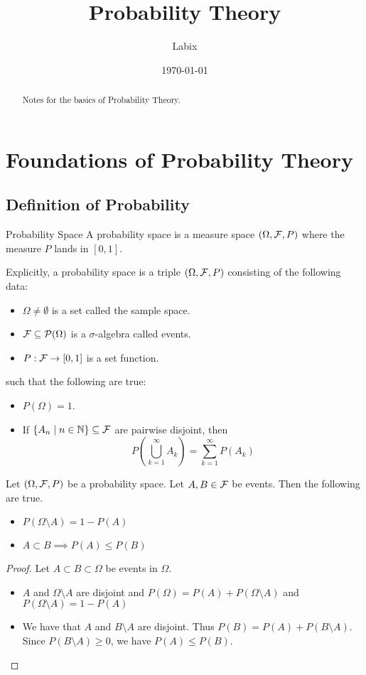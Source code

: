\documentclass[a4paper]{article}
\title{Probability Theory}
\author{Labix}
\date{\today}
\begin{document}
\maketitle
\begin{abstract}
Notes for the basics of Probability Theory. 
\end{abstract}
\tableofcontents
\pagebreak

\section{Foundations of Probability Theory}
\subsection{Definition of Probability}
\begin{defn}{Probability Space}{} A probability space is a measure space $(\Omega,\mathcal{F},P)$ where the measure $P$ lands in $[0,1]$. 
\end{defn}

Explicitly, a probability space is a triple $(\Omega,\mathcal{F},P)$ consisting of the following data: 
\begin{itemize}
\item $\Omega\neq\emptyset$ is a set called the sample space. 
\item $\mathcal{F}\subseteq\mathcal{P}(\Omega)$ is a $\sigma$-algebra called events.  \item $P:\mathcal{F}\to[0,1]$ is a set function. 
\end{itemize}
such that the following are true: 
\begin{itemize}
\item $P(\Omega)=1$. 
\item If $\{A_n\;|\;n\in\mathbb{N}\}\subseteq\mathcal{F}$ are pairwise disjoint, then $$P\left(\bigcup_{k=1}^\infty A_k\right)=\sum_{k=1}^{\infty}P(A_k)$$
\end{itemize}

\begin{prp}{}{} Let $(\Omega,\mathcal{F},P)$ be a probability space. Let $A,B\in\mathcal{F}$ be events. Then the following are true. 
\begin{itemize}
\item $P(\Omega\setminus A)=1-P(A)$
\item $A\subset B\implies P(A)\leq P(B)$
\end{itemize} \tcbline
\begin{proof} Let $A\subset B\subset\Omega$ be events in $\Omega$. 
\begin{itemize}
\item $A$ and $\Omega\setminus A$ are disjoint and $P(\Omega)=P(A)+P(\Omega\setminus A)$ and $P(\Omega\setminus A)=1-P(A)$
\item We have that $A$ and $B\setminus A$ are disjoint. Thus $P(B)=P(A)+P(B\setminus A)$. Since $P(B\setminus A)\geq 0$, we have $P(A)\leq P(B)$.  
\end{itemize}
\end{proof}
\end{prp}
\end{document}
